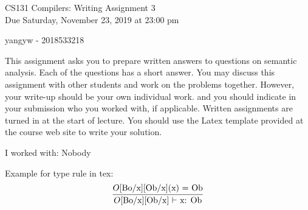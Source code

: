 \documentclass[10pt]{article}
\newcommand{\infertext}[2]{\infer{{\textrm{#1}}}{#2}}
\begin{document}
\begin{center}
\Large CS131 Compilers: Writing Assignment 3\\Due Saturday, November 23, 2019 at 23:00 pm
\end{center}

\begin{center}
\LARGE yangyw - 2018533218
\end{center}

This assignment asks you to prepare written answers to questions on
semantic analysis. Each of the questions has a short answer. You
may discuss this assignment with other students and work on the problems
together. However, your write-up should be your own individual work.
and you should indicate in your submission who you worked with, if applicable.
Written assignments are turned in at the start of lecture.
You should use the Latex template provided at the course web site to write your solution.

\begin{center}
I worked with: Nobody
\end{center}

Example for type rule in tex:
\[\infertext
          {$O$[Bo/x][Ob/x] $\vdash$ x: Ob}
          {\textrm{$O$[Bo/x][Ob/x](x) = Ob}}       
\]
\end{document}
